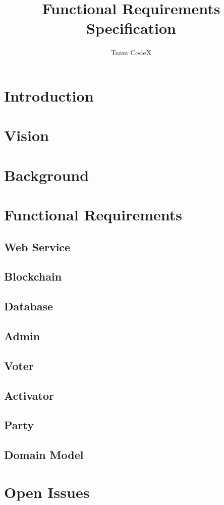 \documentclass[11pt]{article}
\author{Team CodeX}
\title{Functional Requirements Specification}
\begin{document}
	\setlength{\parskip}{6pt}
	
	
	
	\tableofcontents
	\newpage
	
	\listoffigures
	\newpage
	
	\section{Introduction}
		
	
	\section{Vision}
		
	
	\section{Background}
		
		\newpage
		
	\section{Functional Requirements}

	\subsection{Web Service}
		
		\newpage
		
	\subsection{Blockchain}
		
		\newpage
		
	\subsection{Database}
		
		\newpage
		
	\subsection{Admin}
		
		\newpage
		
	\subsection{Voter}
		
		\newpage
		
	\subsection{Activator}
		
		\newpage
		
	\subsection{Party}
		
		\newpage
		
	\subsection{Domain Model}
		
		\newpage
		
	\section{Open Issues}
		
	
\end{document}
